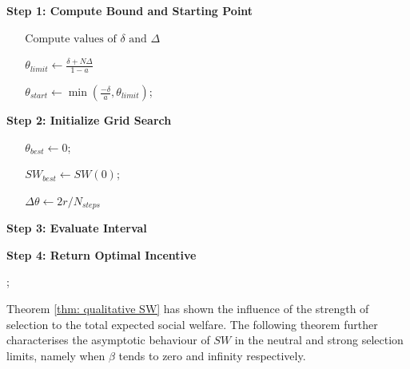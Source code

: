 \documentclass{article}
\begin{document}
\begin{algorithm}[H]
\caption{Restricted Interval Grid Search with Upper and Lower Bounds Cutoff}
\label{alg:pgg_main}

\textbf{Step 1: Compute Bound and Starting Point}

$\;\;\;\;\;\; \text{Compute values of } \delta \text{ and } \Delta$

$\;\;\;\;\;\;\theta_{limit} \gets \frac{\delta + N\Delta}{1-a}$ 

$\;\;\;\;\;\;\theta_{start} \gets \min \left( \frac{-\delta}{a}, \theta_{limit} \right)$;

\textbf{Step 2: Initialize Grid Search}

$\;\;\;\;\;\;\theta_{best} \gets 0$;

$\;\;\;\;\;\;SW_{best} \gets SW(0)$;

$\;\;\;\;\;\;\Delta \theta \gets 2r / N_{steps}$ 

\textbf{Step 3: Evaluate Interval}


\textbf{Step 4: Return Optimal Incentive}

;
\end{algorithm}

Theorem \ref{thm: qualitative SW} has shown the influence of the strength of selection to the total expected social welfare. The following theorem further characterises the asymptotic behaviour of $SW$ in the neutral and strong selection limits, namely when $\beta$ tends to zero and infinity respectively.
\end{document}
